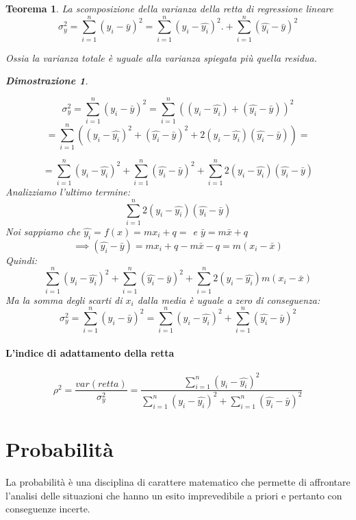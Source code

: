 \documentclass{article}
\newtheorem{teorema}{Teorema}[section]
\newtheorem{dimostrazione}{Dimostrazione}
\begin{document}
          \begin{teorema}{} La scomposizione della varianza della retta di regressione lineare 
          $$ \sigma^2_y= \sum_{i=1}^n(y_i-\bar{y})^2= 
          \sum_{i=1}^n(y_i-\hat{y_i})^2. +  \sum_{i=1}^n(\hat{y_i}-\bar{y})^2 $$
          
          Ossia la varianza totale è uguale alla varianza spiegata più quella residua. 
          
          \begin{dimostrazione}
          
          \end{dimostrazione}
           $$ \sigma^2_y= \sum_{i=1}^n(y_i-\bar{y})^2= 
              \sum_{i=1}^n((y_i-\hat{y_i})+(\hat{y_i}-\bar{y}))^2$$
           $$
             = \sum_{i=1}^n((y_i-\hat{y_i})^2+(\hat{y_i}-\bar{y})^2+2(y_i-\hat{y_i})(\hat{y_i}-\bar{y}))=
           $$
           
           $$
                 = \sum_{i=1}^n(y_i-\hat{y_i})^2+ \sum_{i=1}^n(\hat{y_i}-\bar{y})^2+\sum_{i=1}^n2(y_i-\hat{y_i})(\hat{y_i}-\bar{y})
           $$
           Analizziamo l'ultimo termine: 
           $$
                \sum_{i=1}^n2(y_i-\hat{y_i})(\hat{y_i}-\bar{y})
           $$
           Noi sappiamo che $\hat{y_i}=f(x)=mx_i+q=$ e $\bar{y}= m\bar{x}+q$
           $$
            \implies (\hat{y_i}-\bar{y})= mx_i+q -m\bar{x}-q = m(x_i-\bar{x})
           $$
           Quindi: 
           $$
               \sum_{i=1}^n(y_i-\hat{y_i})^2+ \sum_{i=1}^n(\hat{y_i}-\bar{y})^2+\sum_{i=1}^n2(y_i-\hat{y_i})m(x_i-\bar{x})
           $$
           Ma la somma degli scarti di $x_i$ dalla media è uguale a zero di conseguenza: 
           $$
                 \sigma^2_y= \sum_{i=1}^n(y_i-\bar{y})^2=  \sum_{i=1}^n(y_i-\hat{y_i})^2+ \sum_{i=1}^n(\hat{y_i}-\bar{y})^2
           $$
          \end{teorema}
            
         \paragraph{L'indice di adattamento della retta}
         $$ \rho^2 = \frac{var(retta)}{\sigma^2_y}=  
         \frac{\sum_{i=1}^n(y_i-\hat{y_i})^2}
              {\sum_{i=1}^n(y_i-\hat{y_i})^2+ \sum_{i=1}^n(\hat{y_i}-\bar{y})^2}
         $$
         
         \newpage
         \section{Probabilità}
         La probabilità è una disciplina di carattere matematico che permette di affrontare l’analisi delle situazioni che hanno un esito imprevedibile a priori e pertanto con conseguenze incerte.
         
\end{document}
